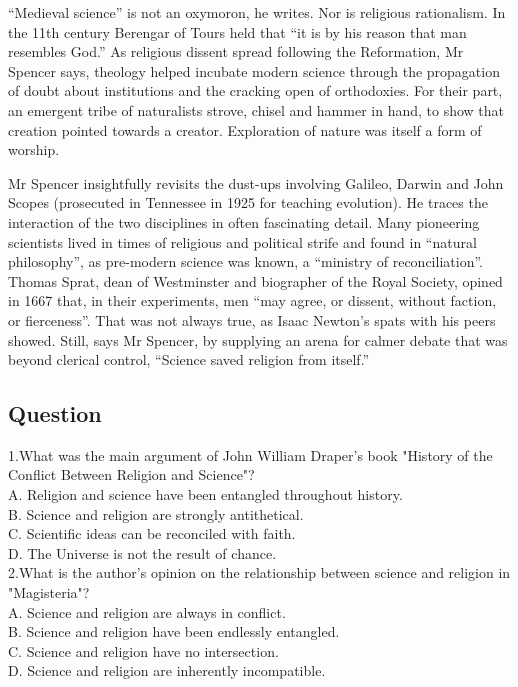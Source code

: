 \documentclass[10pt, a4paper, oneside]{article}
\begin{document}
\begin{spacing}{2.0}
“Medieval science” is not an oxymoron, he writes. Nor is religious rationalism. In the 11th century Berengar of Tours held that 
“it is by his reason that man resembles God.” As religious dissent spread following the Reformation, Mr Spencer says, theology helped 
incubate modern science through the propagation of doubt about institutions and the cracking open of orthodoxies. For their part, 
an emergent tribe of naturalists strove, chisel and hammer in hand, to show that creation pointed towards a creator. Exploration of nature 
was itself a form of worship.

Mr Spencer insightfully revisits the dust-ups involving Galileo, Darwin and John Scopes (prosecuted in
Tennessee in 1925 for teaching evolution). He traces the interaction of the two disciplines in often
fascinating detail. Many pioneering scientists lived in times of religious and political strife and found in “natural philosophy”, 
as pre-modern science was known, a “ministry of reconciliation”. Thomas Sprat, dean of Westminster and biographer of the Royal Society, 
opined in 1667 that, in their experiments, men “may agree, or dissent, without faction, or fierceness”. That was not always true, 
as Isaac Newton's spats with his peers showed. Still, says Mr Spencer, by supplying an arena for calmer debate that was beyond clerical 
control, “Science saved religion from itself.”
\subsection{Question}
1.What was the main argument of John William Draper's book "History of the Conflict Between Religion and Science"?\\
A. Religion and science have been entangled throughout history.\\
B. Science and religion are strongly antithetical.\\
C. Scientific ideas can be reconciled with faith.\\
D. The Universe is not the result of chance.\\

2.What is the author's opinion on the relationship between science and religion in "Magisteria"?\\
A. Science and religion are always in conflict.\\
B. Science and religion have been endlessly entangled.\\
C. Science and religion have no intersection.\\
D. Science and religion are inherently incompatible.\\


\end{spacing}
\end{document}
